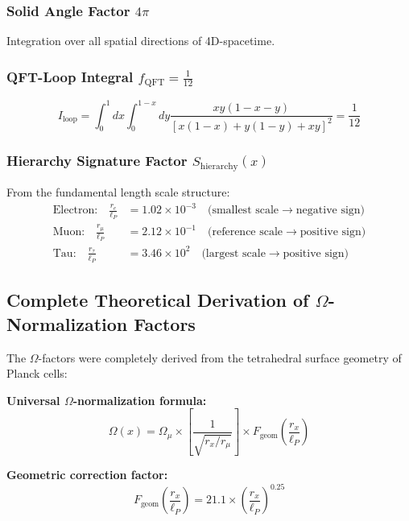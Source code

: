\documentclass[12pt,a4paper]{article}
\numberwithin{equation}{section}
\newcommand{\fQFT}{f_{\text{QFT}}}
\newcommand{\lP}{\ell_P}
\newcommand{\Omegafactor}{\Omega}
\begin{document}
	\subsubsection{Solid Angle Factor $4\pi$}
	Integration over all spatial directions of 4D-spacetime.
	
	\subsubsection{QFT-Loop Integral $\fQFT = \frac{1}{12}$}
	\begin{equation}
		I_{\text{loop}} = \int_0^1 dx \int_0^{1-x} dy \frac{xy(1-x-y)}{[x(1-x) + y(1-y) + xy]^2} = \frac{1}{12}
		\label{eq:loop_integral}
	\end{equation}
	
	\subsubsection{Hierarchy Signature Factor $S_{\text{hierarchy}}(x)$}
	
	From the fundamental length scale structure:
	\begin{align}
		\text{Electron:} \quad \frac{r_e}{\ell_P} &= 1.02 \times 10^{-3} \quad \text{(smallest scale} \rightarrow \text{negative sign)}\\
		\text{Muon:} \quad \frac{r_\mu}{\ell_P} &= 2.12 \times 10^{-1} \quad \text{(reference scale} \rightarrow \text{positive sign)}\\
		\text{Tau:} \quad \frac{r_\tau}{\ell_P} &= 3.46 \times 10^{2} \quad \text{(largest scale} \rightarrow \text{positive sign)}
		\label{eq:length_scales}
	\end{align}
	
	\subsection{Complete Theoretical Derivation of $\Omega$-Normalization Factors}
	
	The $\Omega$-factors were completely derived from the tetrahedral surface geometry of Planck cells:
	
	\textbf{Universal $\Omegafactor$-normalization formula:}
	\begin{equation}
		\Omegafactor(x) = \Omegafactor_\mu \times \left[\frac{1}{\sqrt{r_x/r_\mu}}\right] \times F_{\text{geom}}\left(\frac{r_x}{\lP}\right)
		\label{eq:omega_universal}
	\end{equation}
	
	\textbf{Geometric correction factor:}
	\begin{equation}
		F_{\text{geom}}\left(\frac{r_x}{\lP}\right) = 21.1 \times \left(\frac{r_x}{\lP}\right)^{0.25}
		\label{eq:f_geom}
	\end{equation}
	
\end{document}
